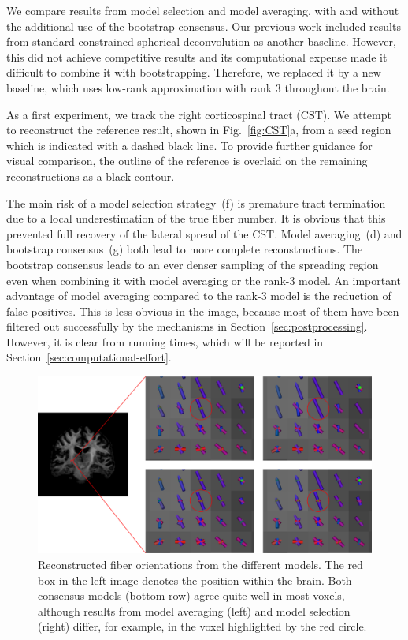 We compare results from model selection and model averaging, with and without the additional use of the bootstrap consensus. Our previous work \cite{Gruen:2021} included results from standard constrained spherical deconvolution as another baseline. However, this did not achieve competitive results and its computational expense made it difficult to combine it with bootstrapping. Therefore, we replaced it by a new baseline, which uses low-rank approximation with rank 3 throughout the brain.

As a first experiment, we track the right corticospinal tract (CST). We attempt to reconstruct the reference result, shown in Fig.~\ref{fig:CST}a, from a seed
region which is indicated with a dashed black line. To provide further guidance for visual comparison, the outline of the reference is overlaid on the remaining reconstructions as a black contour.

The main risk of a model selection strategy~(f) is premature tract termination due to a local underestimation of the true fiber number. It is obvious that this prevented full recovery of the lateral spread of the CST. Model averaging~(d) and bootstrap consensus~(g) both lead to more complete reconstructions. The bootstrap consensus leads to an ever denser sampling of the spreading region even when combining it with model averaging or the rank-3 model. An important advantage of model averaging compared to the rank-3 model is the reduction of false positives. This is less obvious in the image, because most of them have been filtered out successfully by the mechanisms in Section~\ref{sec:postprocessing}. However, it is clear from running times, which will be reported in Section~\ref{sec:computational-effort}.

\begin{figure}
	\centering
	\includegraphics[width=\linewidth]{dir}
	\caption{Reconstructed fiber orientations from the different models. The
          red box in the left image denotes the position within the brain. Both consensus
          models (bottom row) agree quite well in most voxels, although results from model averaging (left) and model selection (right) differ, for example, in the voxel highlighted by the red circle.}
	\label{fig:directions}
\end{figure}

